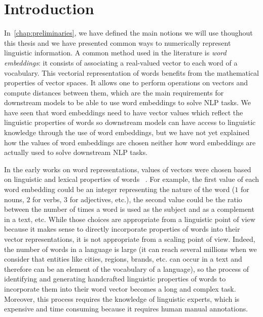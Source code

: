 \section{Introduction}
  In~\autoref{chap:preliminaries}, we have defined the main notions we will use
  thoughout this thesis and we have presented common ways to numerically
  represent linguistic information. A common method used in the literature is
  \textit{word embeddings}: it consists of associating a real-valued vector to
  each word of a vocabulary. This vectorial representation of words benefits
  from the mathematical properties of vector spaces. It allows one to perform
  operations on vectors and compute distances between them, which are the main
  requirements for downstream models to be able to use word embeddings to solve
  NLP tasks. We have seen that word embeddings need to have vector values which
  reflect the linguistic properties of words so downstream models can have
  access to linguistic knowledge through the use of word embeddings, but we have
  not yet explained how the values of word embeddings are chosen neither how
  word embeddings are actually used to solve downstream NLP tasks. \medskip

  In the early works on word representations, values of vectors were chosen
  based on linguistic and lexical properties of
  words~\citep{osgood1964semantic,bierwisch1970classifying} . For example, the
  first value of each word embedding could be an integer representing the nature
  of the word ($1$ for nouns, $2$ for verbs, $3$ for adjectives, etc.), the
  second value could be the ratio between the number of times a word is used as
  the subject and as a complement in a text, etc. While those choices are
  appropriate from a linguistic point of view because it makes sense to directly
  incorporate properties of words into their vector representations, it is not
  appropriate from a scaling point of view. Indeed, the number of words in a
  language is large (it can reach several millions when we consider that
  entities like cities, regions, brands, etc. can occur in a text and therefore
  can be an element of the vocabulary of a language), so the process of
  identifying and generating handcrafted linguistic properties of words to
  incorporate them into their word vector becomes a long and complex task.
  Moreover, this process requires the knowledge of linguistic experts, which is
  expensive and time consuming because it requires human manual annotations.
  \medskip


